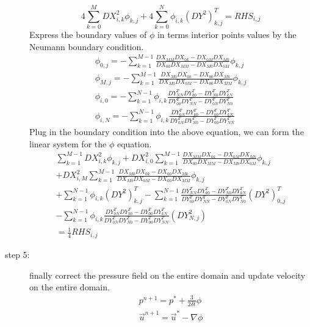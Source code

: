 \documentclass[12pt]{article}
\begin{document}
\begin{description}
\begin{equation}
4\sum_{k=0}^{M}DX^{2}_{i,k}\phi_{k,j} + 4\sum_{k=0}^{N}\phi_{i,k}(DY^{2})^{T}_{k,j}= RHS_{i,j}
\end{equation}
Express the boundary values of $\phi$ in terms interior points values by the Neumann boundary condition.\\
\begin{align}
\phi_{0,j} = 
-\sum_{k=1}^{M-1}\frac{DX_{MM}DX_{0k}-DX_{0M}DX_{Mk}}
{DX_{00}DX_{MM}-DX_{M0}DX_{0M}} \phi_{k,j}\\
\phi_{M,j} = 
-\sum_{k=1}^{M-1}\frac{DX_{M0}DX_{0k}-DX_{00}DX_{Mk}}
{DX_{M0}DX_{0M}-DX_{00}DX_{MM}} \phi_{k,j}\\
\phi_{i,0} = 
-\sum_{k=1}^{N-1}\phi_{i,k}\frac{DY^{T}_{NN}DY^{T}_{k0}-DY^{T}_{N0}DY^{T}_{kN}}
{DY^{T}_{00}DY^{T}_{NN}-DY^{T}_{0N}DY^{T}_{N0}} \\
\phi_{i,N} = 
-\sum_{k=1}^{N-1}\phi_{i,k}\frac{DY^{T}_{0N}DY^{T}_{k0}-DY^{T}_{00}DY^{T}_{kN}}
{DY^{T}_{0N}DY^{T}_{N0}-DY^{T}_{00}DY^{T}_{NN}}
\end{align}
Plug in the boundary condition into the above equation, we can form the linear system for the $\phi$ equation.
\begin{align}
\sum_{k=1}^{M-1}DX^{2}_{i,k}\phi_{k,j}
+DX^{2}_{i,0}\sum_{k=1}^{M-1}\frac{DX_{MM}DX_{0k}-DX_{0M}DX_{Mk}}
{DX_{00}DX_{MM}-DX_{M0}DX_{0M}} \phi_{k,j} \\
+DX^{2}_{i,M}\sum_{k=1}^{M-1}\frac{DX_{M0}DX_{0k}-DX_{00}DX_{Mk}}
{DX_{M0}DX_{0M}-DX_{00}DX_{MM}} \phi_{k,j}\\
+ \sum_{k=1}^{N-1}\phi_{i,k}(DY^{2})^{T}_{k,j}
-\sum_{k=1}^{N-1}\frac{DY^{T}_{NN}DY^{T}_{k0}-DY^{T}_{N0}DY^{T}_{kN}}
{DY^{T}_{00}DY^{T}_{NN}-DY^{T}_{0N}DY^{T}_{N0}}(DY^{2})^{T}_{0,j}\\
-\sum_{k=1}^{N-1}\phi_{i,k}\frac{DY^{T}_{0N}DY^{T}_{k0}-DY^{T}_{00}DY^{T}_{kN}}
{DY^{T}_{0N}DY^{T}_{N0}-DY^{T}_{00}DY^{T}_{NN}}(DY^{2}_{N,j})\\
= \frac{1}{4}RHS_{i,j}
\end{align}

\item[step 5:] finally correct the pressure field on the entire domain
and update velocity on the entire  domain.\\
\begin{align}
p^{n+1}={p}^{*} + \frac{3}{2\delta t}\phi  \\
\vec{u}^{n+1} = \vec{u}^{*} - \nabla \phi
\end{align}

\end{description}


\end{document}
